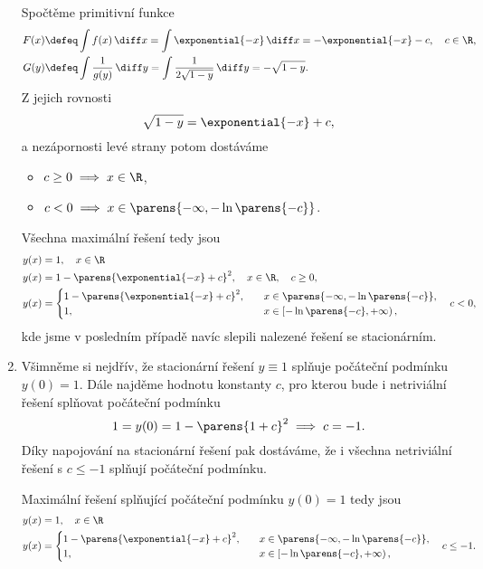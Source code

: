\documentclass[answers]{exam}
\begin{document}
\begin{questions}
\begin{solution}
\begin{enumerate}[label=(\roman*)]
	  	Spočtěme primitivní funkce
	  	\begin{align*}
	  		F(x)
	  		&\defeq
	  		\int f(x) \, \diff x
	  		=
	  		\int \exponential{-x} \, \diff x
	  		=
	  		- \exponential{-x} - c, \quad c \in \R,
	  		\\
	  		G(y)
	  		&\defeq
	  		\int \frac{1}{g(y)} \, \diff y
	  		=
	  		\int \frac{1}{2 \sqrt{1 - y}} \, \diff y
	  		=
	      - \sqrt{1 - y}.
	  	\end{align*}
	  	Z jejich rovnosti
	  	\begin{equation*}
	  		\sqrt{1 - y}
	  		=
	  		\exponential{-x} + c,
	  	\end{equation*}
	  	a nezápornosti levé strany potom dostáváme
	  	\begin{itemize}
	  		\item $c \ge 0 \implies x \in \R$,
	  		\item $c < 0 \implies x \in \parens{-\infty, -\ln\parens{-c}}$.
	  	\end{itemize}
	  	
	  	Všechna maximální řešení tedy jsou
	  	\begin{align*}
	  		y(x) &= 1, \quad x \in \R
	  		\\
	  		y(x) &= 1 - \parens{\exponential{-x} + c}^2, \quad x \in \R, \quad c \ge 0,
	  		\\
	  		y(x) &=
	  		\begin{cases}
	  			1 - \parens{\exponential{-x} + c}^2, \quad &x \in \parens{-\infty, -\ln\parens{-c}},
	  			\\
	  			1, \quad &x \in \left[-\ln\parens{-c}, +\infty \right),
	  		\end{cases}
	  		\quad c < 0,
	  	\end{align*}
	  	kde jsme v posledním případě navíc slepili nalezené řešení se stacionárním.
	  \item 
	  	Všimněme si nejdřív, že stacionární řešení $y \equiv 1$ splňuje počáteční podmínku $y(0) = 1$. Dále najděme hodnotu konstanty $c$, pro kterou bude i netriviální řešení splňovat počáteční podmínku
	  	\begin{equation*}
	  		1 = y(0) = 1 - \parens{1 +c}^2 \implies c = -1.
	  	\end{equation*}
	  	Díky napojování na stacionární řešení pak dostáváme, že i všechna netriviální řešení s $c \le -1$ splňují počáteční podmínku.
	  	
	  	Maximální řešení splňující počáteční podmínku $y(0) = 1$ tedy jsou
	  	\begin{align*}
	  		y(x) &= 1, \quad x \in \R
	  		\\
	  		y(x) &=
	  		\begin{cases}
	  			1 - \parens{\exponential{-x} + c}^2, \quad &x \in \parens{-\infty, -\ln\parens{-c}},
	  			\\
	  			1, \quad &x \in \left[-\ln\parens{-c}, +\infty \right),
	  		\end{cases}
	  		\quad c \le -1.
	  	\end{align*}


\end{enumerate}
\end{solution}
\end{questions}
\end{document}
